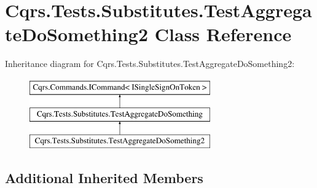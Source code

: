 \hypertarget{classCqrs_1_1Tests_1_1Substitutes_1_1TestAggregateDoSomething2}{}\section{Cqrs.\+Tests.\+Substitutes.\+Test\+Aggregate\+Do\+Something2 Class Reference}
\label{classCqrs_1_1Tests_1_1Substitutes_1_1TestAggregateDoSomething2}
Inheritance diagram for Cqrs.\+Tests.\+Substitutes.\+Test\+Aggregate\+Do\+Something2\+:\begin{figure}[H]
\begin{center}
\leavevmode
\includegraphics[height=3.000000cm]{classCqrs_1_1Tests_1_1Substitutes_1_1TestAggregateDoSomething2}
\end{center}
\end{figure}
\subsection*{Additional Inherited Members}
